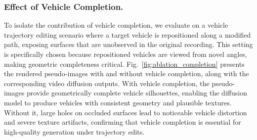 \documentclass[runningheads]{llncs}
\begin{document}
\subsubsection{Effect of Vehicle Completion.}
To isolate the contribution of vehicle completion, we evaluate on a vehicle trajectory editing scenario where a target vehicle is repositioned along a modified path, exposing surfaces that are unobserved in the original recording. This setting is specifically chosen because repositioned vehicles are viewed from novel angles, making geometric completeness critical. Fig.~\ref{fig:ablation_completion} presents the rendered pseudo-images with and without vehicle completion, along with the corresponding video diffusion outputs. With vehicle completion, the pseudo-images provide geometrically complete vehicle silhouettes, enabling the diffusion model to produce vehicles with consistent geometry and plausible textures. Without it, large holes on occluded surfaces lead to noticeable vehicle distortion and severe texture artifacts, confirming that vehicle completion is essential for high-quality generation under trajectory edits.
\end{document}
